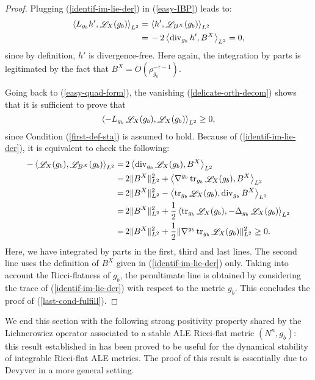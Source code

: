 \documentclass[a4paper,11pt,reqno]{amsart}
\def\tr{\mathop{\rm tr}\nolimits}
\def\div{\mathop{\rm div}\nolimits}
\def\Li{\mathop{\rm \mathscr{L}}\nolimits}
\def\tr{\mathop{\rm tr}\nolimits}
\def\div{\mathop{\rm div}\nolimits}
\def\Li{\mathop{\rm \mathscr{L}}\nolimits}
\numberwithin{equation}{section}
\begin{document}
\begin{proof}
Plugging (\ref{identif-im-lie-der}) in (\ref{easy-IBP}) leads to:
\begin{equation}
\begin{split}
\left<L_{g_b}h',\Li_X(g_b)\right>_{L^2}=\,&\left<h',\Li_{B^X}(g_b)\right>_{L^2}\\
=\,&-2\left<\div_{g_b}h',B^X\right>_{L^2}=0,\label{delicate-orth-decom}
\end{split}
\end{equation}
since by definition, $h'$ is divergence-free. Here again, the integration by parts is legitimated by the fact that $B^X=O(\rho_{g_b}^{-\tau-1})$. 

Going back to (\ref{easy-quad-form}), the vanishing (\ref{delicate-orth-decom}) shows that it is sufficient to prove that 
\begin{equation}
\left<-L_{g_b}\Li_X(g_b),\Li_X(g_b)\right>_{L^2}\geq 0,\label{last-cond-fulfill}
\end{equation}
 since Condition (\ref{first-def-sta}) is assumed to hold. Because of (\ref{identif-im-lie-der}), it is equivalent to check the following:
\begin{equation}
\begin{split}\label{IBP-Bianchi-lemma-loc-stab}
-\left<\Li_X(g_b),\Li_{B^X}(g_b)\right>_{L^2}=\,&2\left<\div_{g_b}\Li_X(g_b),B^X\right>_{L^2}\\
=\,&2\|B^X\|_{L^2}^2+\left<\nabla^{g_b}\tr_{g_b}\Li_X(g_b),B^X\right>_{L^2}\\
=\,&2\|B^X\|_{L^2}^2-\left<\tr_{g_b}\Li_X(g_b),\div_{g_b}B^X\right>_{L^2}\\
=\,&2\|B^X\|_{L^2}^2+\frac{1}{2}\left<\tr_{g_b}\Li_X(g_b),-\Delta_{g_b}\Li_{X}(g_b)\right>_{L^2}\\
=\,&2\|B^X\|_{L^2}^2+\frac{1}{2}\|\nabla^{g_b}\tr_{g_b}\Li_{X}(g_b)\|_{L^2}^2\geq 0.
\end{split}
\end{equation}
Here, we have integrated by parts in the first, third and last lines. The second line uses the definition of $B^X$ given in (\ref{identif-im-lie-der}) only. Taking into account the Ricci-flatness of $g_b$, the penultimate line is obtained by considering the trace of (\ref{identif-im-lie-der}) with respect to the metric $g_b$. This concludes the proof of (\ref{last-cond-fulfill}).
	\end{proof}
	We end this section with the following strong positivity property shared by the Lichnerowicz operator associated to a stable ALE Ricci-flat metric $(N^n,g_b)$: this result established in \cite[Theorem $3.9$]{Der-Kro} has been proved to be useful for the dynamical stability of integrable Ricci-flat ALE metrics. The proof of this result is essentially due to Devyver \cite{Dev-Gau-Est} in a more general setting. 
	
\end{document}
